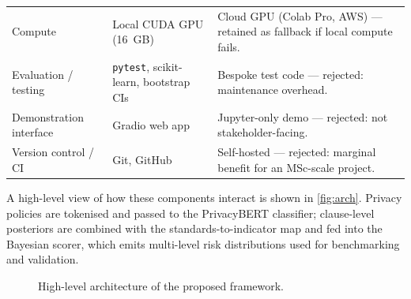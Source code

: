 \documentclass[12pt,a4paper,titlepage]{article}
\let\orgautoref\autoref
\renewcommand{\autoref}[1]{\def\equationautorefname{Eq.}\orgautoref{#1}}
\begin{document}
\begin{table}[hbt]
\begin{tabularx}{\linewidth}{@{}l X X@{}}
        Compute & Local CUDA GPU (16~GB) & Cloud GPU (Colab Pro, AWS) --- retained as fallback if local compute fails. \\
        Evaluation / testing & \texttt{pytest}, scikit-learn, bootstrap CIs & Bespoke test code --- rejected: maintenance overhead. \\
        Demonstration interface & Gradio web app & Jupyter-only demo --- rejected: not stakeholder-facing. \\
        Version control / CI & Git, GitHub & Self-hosted --- rejected: marginal benefit for an MSc-scale project. \\
        \bottomrule
    \end{tabularx}
\end{table}

A high-level view of how these components interact is shown in \autoref{fig:arch}. Privacy policies are tokenised and passed to the PrivacyBERT classifier; clause-level posteriors are combined with the standards-to-indicator map and fed into the Bayesian scorer, which emits multi-level risk distributions used for benchmarking and validation.

\begin{figure}[htbp]
    \centering
    \caption{High-level architecture of the proposed framework.}
    \label{fig:arch}
\end{figure}
\end{document}
